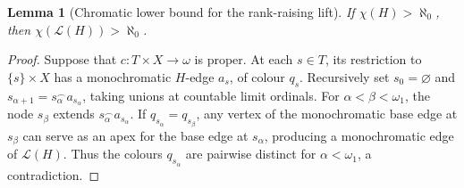 \documentclass[a4paper,11pt,reqno]{amsart}
\theoremstyle{plain}
\newtheorem{lemma}[theorem]{Lemma}
\theoremstyle{definition}
\theoremstyle{remark}
\begin{document}
\begin{lemma}[Chromatic lower bound for the rank-raising lift]
\label{uniform-lift-chromatic}
If $\chi(H)>\aleph_0$, then $\chi(\mathcal L(H))>\aleph_0$.
\end{lemma}
\begin{proof}
Suppose that $c:T\times X\to\omega$ is proper.  At each $s\in T$, its
restriction to $\{s\}\times X$ has a monochromatic $H$-edge $a_s$, of
colour $q_s$.  Recursively set $s_0=\varnothing$ and
$s_{\alpha+1}=s_\alpha^\frown a_{s_\alpha}$, taking unions at countable
limit ordinals.  For $\alpha<\beta<\omega_1$, the node $s_\beta$ extends
$s_\alpha^\frown a_{s_\alpha}$.  If
$q_{s_\alpha}=q_{s_\beta}$, any vertex of the monochromatic base edge at
$s_\beta$ can serve as an apex for the base edge at $s_\alpha$, producing
a monochromatic edge of $\mathcal L(H)$.  Thus the colours $q_{s_\alpha}$
are pairwise distinct for $\alpha<\omega_1$, a contradiction.
\end{proof}
\end{document}

